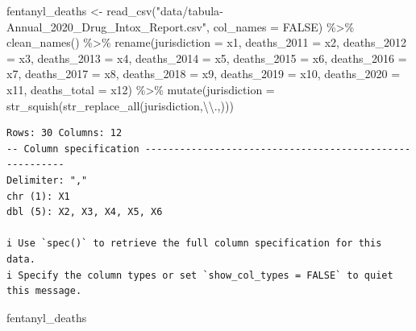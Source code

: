 \documentclass[
  letterpaper,
  DIV=11,
  numbers=noendperiod]{scrreprt}
\newenvironment{Shaded}{\begin{snugshade}}{\end{snugshade}}
\newcommand{\AttributeTok}[1]{\textcolor[rgb]{0.40,0.45,0.13}{#1}}
\newcommand{\ConstantTok}[1]{\textcolor[rgb]{0.56,0.35,0.01}{#1}}
\newcommand{\FunctionTok}[1]{\textcolor[rgb]{0.28,0.35,0.67}{#1}}
\newcommand{\NormalTok}[1]{\textcolor[rgb]{0.00,0.23,0.31}{#1}}
\newcommand{\OtherTok}[1]{\textcolor[rgb]{0.00,0.23,0.31}{#1}}
\newcommand{\SpecialCharTok}[1]{\textcolor[rgb]{0.37,0.37,0.37}{#1}}
\newcommand{\StringTok}[1]{\textcolor[rgb]{0.13,0.47,0.30}{#1}}
\begin{document}
\begin{Shaded}
\begin{Highlighting}[]
\NormalTok{fentanyl\_deaths }\OtherTok{\textless{}{-}} \FunctionTok{read\_csv}\NormalTok{(}\StringTok{"data/tabula{-}Annual\_2020\_Drug\_Intox\_Report.csv"}\NormalTok{, }\AttributeTok{col\_names =} \ConstantTok{FALSE}\NormalTok{) }\SpecialCharTok{\%\textgreater{}\%} 
  \FunctionTok{clean\_names}\NormalTok{() }\SpecialCharTok{\%\textgreater{}\%} 
  \FunctionTok{rename}\NormalTok{(}\AttributeTok{jurisdiction =}\NormalTok{ x1, }\AttributeTok{deaths\_2011 =}\NormalTok{ x2, }\AttributeTok{deaths\_2012 =}\NormalTok{ x3, }\AttributeTok{deaths\_2013 =}\NormalTok{ x4, }\AttributeTok{deaths\_2014 =}\NormalTok{ x5, }\AttributeTok{deaths\_2015 =}\NormalTok{ x6, }\AttributeTok{deaths\_2016 =}\NormalTok{ x7, }\AttributeTok{deaths\_2017 =}\NormalTok{ x8, }
         \AttributeTok{deaths\_2018 =}\NormalTok{ x9, }\AttributeTok{deaths\_2019 =}\NormalTok{ x10, }\AttributeTok{deaths\_2020 =}\NormalTok{ x11, }\AttributeTok{deaths\_total =}\NormalTok{ x12) }\SpecialCharTok{\%\textgreater{}\%} 
  \FunctionTok{mutate}\NormalTok{(}\AttributeTok{jurisdiction =} \FunctionTok{str\_squish}\NormalTok{(}\FunctionTok{str\_replace\_all}\NormalTok{(jurisdiction,}\StringTok{\textquotesingle{}}\SpecialCharTok{\textbackslash{}\textbackslash{}}\StringTok{.\textquotesingle{}}\NormalTok{,}\StringTok{\textquotesingle{}\textquotesingle{}}\NormalTok{)))}
\end{Highlighting}
\end{Shaded}

\begin{verbatim}
Rows: 30 Columns: 12
-- Column specification --------------------------------------------------------
Delimiter: ","
chr (1): X1
dbl (5): X2, X3, X4, X5, X6

i Use `spec()` to retrieve the full column specification for this data.
i Specify the column types or set `show_col_types = FALSE` to quiet this message.
\end{verbatim}

\begin{Shaded}
\begin{Highlighting}[]
\NormalTok{fentanyl\_deaths}
\end{Highlighting}
\end{Shaded}
\end{document}
